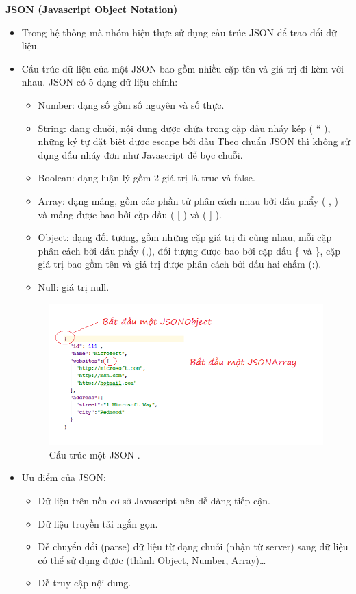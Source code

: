 \documentclass[a4paper,12pt,oneside]{article}
\begin{document}
\textbf{JSON (Javascript Object Notation) \cite{json}}
\begin{itemize}
\item Trong hệ thống mà nhóm hiện thực sử dụng cấu trúc JSON để trao đổi dữ liệu. 
\item Cấu trúc dữ liệu của một JSON bao gồm nhiều cặp tên và giá trị đi kèm với nhau. JSON có 5 dạng dữ liệu chính:
\begin{itemize}
	\item Number: dạng số gồm số nguyên và số thực.
	\item String: dạng chuỗi, nội dung được chứa trong cặp dấu nháy kép ( “ ), những ký tự đặt biệt được escape bởi dấu \. Theo chuẩn JSON thì không sử dụng dấu nháy đơn như Javascript để bọc chuỗi.
	\item Boolean: dạng luận lý gồm 2 giá trị là true và false.
	\item Array: dạng mảng, gồm các phần tử phân cách nhau bởi dấu phẩy ( , ) và mảng được bao bởi cặp dấu ( [ ) và ( ] ).
	\item Object: dạng đối tượng, gồm những cặp giá trị đi cùng nhau, mỗi cặp phân cách bởi dấu phẩy (,), đối tượng được bao bởi cặp dấu \{ và \}, cặp giá trị bao gồm tên và giá trị được phân cách bởi dấu hai chấm (:).
	\item Null: giá trị null.
\end{itemize}


\begin{figure}[H]
	\centering
	\includegraphics[scale=.8]{hinh/json.png}
	\caption{Cấu trúc một JSON \cite{json}.}
	\label{fig:json}
\end{figure}

\item Ưu điểm của JSON:
\begin{itemize}
\item Dữ liệu trên nền cơ sở Javascript nên dễ dàng tiếp cận.
\item Dữ liệu truyền tải ngắn gọn.
\item Dễ chuyển đổi (parse) dữ liệu từ dạng chuỗi (nhận từ server) sang dữ liệu có thể sử dụng được (thành Object, Number, Array)…
\item Dễ truy cập nội dung.
\end{itemize}
\end{itemize}
\end{document}
